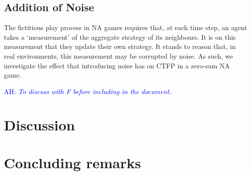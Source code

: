 \documentclass{article}
\theoremstyle{definition}
\newcommand{\ah}[1]{\textcolor{blue}{AH: \textit{#1}}}
\begin{document}
	\subsection{Addition of Noise}

	The fictitious play process in NA games requires that, at each time step, an agent takes a `measurement' of the aggregate strategy of its neighbours. It is on this measurement that they update their own strategy. It stands to reason that, in real environments, this measurement may be corrupted by noise. As such, we investigate the effect that introducing noise has on CTFP in a zero-sum NA game.

	\ah{To discuss with F before including in the document}.
	

	\section{Discussion}

	\section{Concluding remarks}
\end{document}
